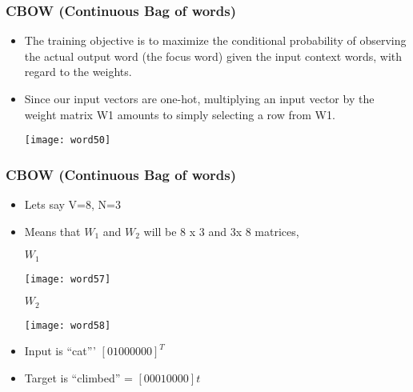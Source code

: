 \begin{frame}[fragile]\frametitle{CBOW (Continuous Bag of words)}
\begin{itemize}
\item The training objective is to maximize the conditional probability of observing the actual output word (the focus word) given the input context words, with regard to the weights. 
\item Since our input vectors are one-hot, multiplying an input vector by the weight matrix W1 amounts to simply selecting a row from W1.

\begin{center}
\texttt{[image: word50]}
\end{center}
\end{itemize}
\end{frame}

\begin{frame}[fragile]\frametitle{CBOW (Continuous Bag of words)}
\begin{itemize}
\item Lets say V=8, N=3 
\item Means that $W_1$ and $W_2$ will be 8 x 3 and 3x 8 matrices,

\begin{center}
$W_1$

\texttt{[image: word57]}

$W_2$

\texttt{[image: word58]}
\end{center}
\item Input is ``cat''' $[0 1 0 0 0 0 0 0]^T$
\item Target is ``climbed'' = $[0 0 0 1 0 0 0 0 ]t$
\end{itemize}
\end{frame}

